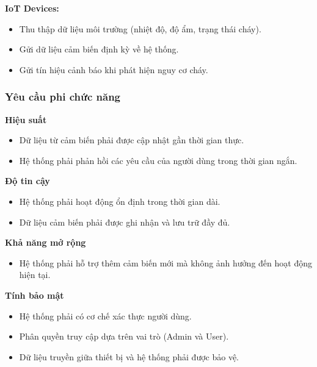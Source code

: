 \documentclass[a4paper,twoside]{article}
\begin{document}
\textbf{IoT Devices:}

\begin{itemize}

\item Thu thập dữ liệu môi trường (nhiệt độ, độ ẩm, trạng thái cháy).

\item Gửi dữ liệu cảm biến định kỳ về hệ thống.

\item Gửi tín hiệu cảnh báo khi phát hiện nguy cơ cháy.

\end{itemize}

\subsubsection{Yêu cầu phi chức năng}

\textbf{Hiệu suất}

\begin{itemize}

\item Dữ liệu từ cảm biến phải được cập nhật gần thời gian thực.

\item Hệ thống phải phản hồi các yêu cầu của người dùng
trong thời gian ngắn.

\end{itemize}

\textbf{Độ tin cậy}

\begin{itemize}

\item Hệ thống phải hoạt động ổn định trong thời gian dài.

\item Dữ liệu cảm biến phải được ghi nhận và lưu trữ đầy đủ.

\end{itemize}

\textbf{Khả năng mở rộng}

\begin{itemize}

\item Hệ thống phải hỗ trợ thêm cảm biến mới
mà không ảnh hưởng đến hoạt động hiện tại.

\end{itemize}

\textbf{Tính bảo mật}

\begin{itemize}

\item Hệ thống phải có cơ chế xác thực người dùng.

\item Phân quyền truy cập dựa trên vai trò (Admin và User).

\item Dữ liệu truyền giữa thiết bị và hệ thống
phải được bảo vệ.

\end{itemize}
\end{document}
